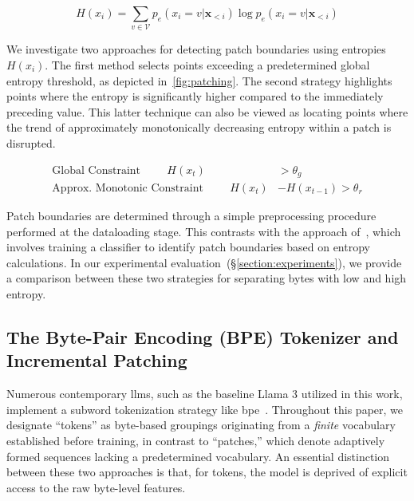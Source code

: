 \begin{equation}
H(x_i) = \sum_{v \in \mathcal{V}} p_{e}(x_i=v|\pmb{x}_{<i}) \log p_{e}(x_i=v|\pmb{x}_{<i})
\end{equation}

We investigate two approaches for detecting patch boundaries using entropies $H(x_i)$. The first method selects points exceeding a predetermined global entropy threshold, as depicted in~\autoref{fig:patching}. The second strategy highlights points where the entropy is significantly higher compared to the immediately preceding value. This latter technique can also be viewed as locating points where the trend of approximately monotonically decreasing entropy within a patch is disrupted.

\begin{align*}
    \text{Global Constraint}\hspace{1cm}H(x_t)& > \theta_g\\
    \text{Approx. Monotonic Constraint}\hspace{1cm}H(x_t)& - H(x_{t-1}) > \theta_r
\end{align*}

Patch boundaries are determined through a simple preprocessing procedure performed at the dataloading stage. This contrasts with the approach of~\citet{nawrot-etal-2023-efficient}, which involves training a classifier to identify patch boundaries based on entropy calculations. In our experimental evaluation~(\S\ref{section:experiments}), we provide a comparison between these two strategies for separating bytes with low and high entropy.

\subsection{The Byte-Pair Encoding (BPE) Tokenizer and Incremental Patching}
\label{section:incremental-patching}
\label{section:bpe-patch}

Numerous contemporary llms, such as the baseline Llama 3 utilized in this work, implement a subword tokenization strategy like bpe~\citep{gage1994new, sennrich-etal-2016-neural}. Throughout this paper, we designate ``tokens'' as byte-based groupings originating from a \textit{finite} vocabulary established before training, in contrast to ``patches,'' which denote adaptively formed sequences lacking a predetermined vocabulary. An essential distinction between these two approaches is that, for tokens, the model is deprived of explicit access to the raw byte-level features.

